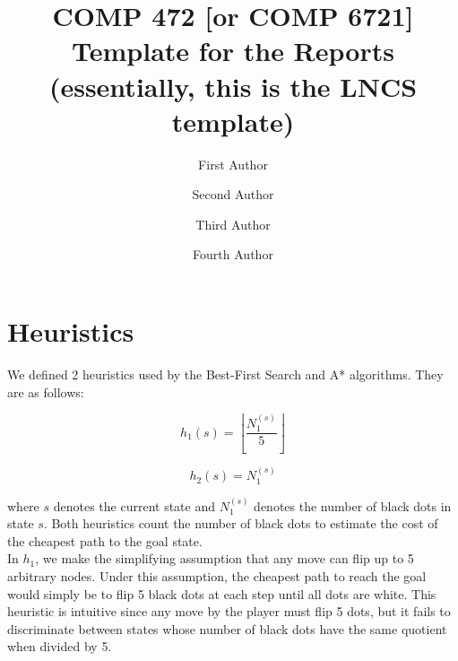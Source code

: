 \documentclass[runningheads]{llncs}
\begin{document}
%
\title{COMP 472 [or COMP 6721] Template for the Reports \\ (essentially, this is the LNCS template)}
%
%
\author{First Author \and
Second Author \and
Third Author
\and
Fourth Author}
%
%
%
\maketitle              %
%
%
%

\section{Heuristics}

We defined 2 heuristics used by the Best-First Search and A* algorithms. They are as follows: 

\begin{equation}
h_1(s) = \left\lfloor\dfrac{N^{(s)}_1}{5}\right\rfloor
\end{equation}

\begin{equation}
h_2(s) = N^{(s)}_1
\end{equation}

where $s$ denotes the current state and $N^{(s)}_1$ denotes the number of black dots in state $s$. Both heuristics count the number of black dots to estimate the cost of the cheapest path to the goal state. \\

In $h_1$, we make the simplifying assumption that any move can flip up to 5 arbitrary nodes. Under this assumption, the cheapest path to reach the goal would simply be to flip 5 black dots at each step until all dots are white. This heuristic is intuitive since any move by the player must flip 5 dots, but it fails to discriminate between states whose number of black dots have the same quotient when divided by 5. \\
\end{document}
